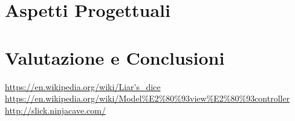 \documentclass{llncs}
\begin{document}
	\section{Aspetti Progettuali}%
	
	\section{Valutazione e Conclusioni}%
	

	\begin{thebibliography}{}
		 \url{https://en.wikipedia.org/wiki/Liar's\_dice}
		 \url{https://en.wikipedia.org/wiki/Model%E2%80%93view%E2%80%93controller}
		 \url{http://slick.ninjacave.com/}
	\end{thebibliography}
\end{document}
